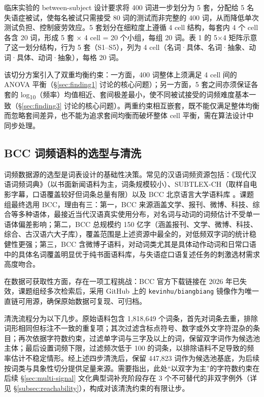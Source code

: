 \documentclass[12pt, a4paper]{article}
\begin{document}
临床实验的 between-subject 设计要求将 400 词进一步划分为 5 套，分配给 5 名失语症被试，使每名被试只需接受 80 词的测试而非完整的 400 词，从而降低单次测试负担、控制疲劳效应。5 套划分在细粒度上遵循 4 cell 结构，每套内 4 个 cell 各含 20 词，形成 5 套 × 4 cell = 20 个小组，每组 20 词。表 1 的 5×4 矩阵示意了这一划分结构，行为 5 套（S1--S5），列为 4 cell（名词·具体、名词·抽象、动词·具体、动词·抽象），每格 20 词。

该切分方案引入了双重均衡约束：一方面，400 词整体上须满足 4 cell 间的 ANOVA 平衡（\S\ref{sec:finding1} 讨论的核心问题）；另一方面，5 套之间亦须保证各套的 log\textsubscript{10}（频率）均值相近、套间极差最小，使不同被试接受的词频难度基本一致（\S\ref{sec:finding3} 讨论的核心问题）。两重约束相互嵌套，既不能仅满足整体均衡而忽略套间差异，也不能为追求套间均衡而破坏整体 cell 平衡，需在算法设计中同步处理。

\subsection{BCC 词频语料的选型与清洗}

词频数据源的选型是词表设计的基础性决策。常见的汉语词频资源包括：《现代汉语词频词典》（以书面新闻语料为主，词条规模较小）、SUBTLEX-CH（取样自电影字幕，口语覆盖较好但词条总量有限）以及 BCC 北京语言大学语料库 \cite{xun2016bcc}。课题组最终选用 BCC，理由有三：第一，BCC 来源涵盖文学、报刊、微博、科技、综合等多种语体，最接近当代汉语真实使用分布，对名词与动词的词频估计不受单一语体偏差影响；第二，BCC 总规模约 150 亿字（涵盖报刊、文学、微博、科技、综合、古汉语六大子库），覆盖范围是上述资源中最全的，对低频双字词的统计稳健性更强；第三，BCC 含微博子语料，对动词类尤其是具体动作动词和日常口语中的具体名词覆盖明显优于纯书面语料库，与失语症口语复述任务的刺激选材需求高度吻合。

在数据可获取性方面，存在一项工程挑战：BCC 官方下载链接在 2026 年已失效，课题组经多次检索后，采用 GitHub 上的 \texttt{kevinhu/biangbiang} 镜像作为唯一直链可用源，确保原始数据可复现、可归档。

清洗流程分为以下几步。原始语料包含 1,818,649 个词条，首先对词条去重，排除词形相同但标注不一致的重复项；其次过滤含标点符号、数字或外文字符混杂的条目；再次依据字符数约束，过滤单字词与三字及以上的词，保留双字词作为候选池主体；最后设置词频下限，过滤频次低于 100 的词条，以排除语料不足导致的频率估计不稳定情形。经上述四步清洗后，保留 447,823 词作为候选池基底，为后续按词类与具象性切分提供足量来源。需要指出，此处“以双字为主”的字符数约束在后续 \S\ref{sec:multi-signal} 文化典型词补充阶段存在 3 个不可替代的非双字例外（详见 \S\ref{subsec:reachability}），构成对该清洗约束的有限让步。
\end{document}
